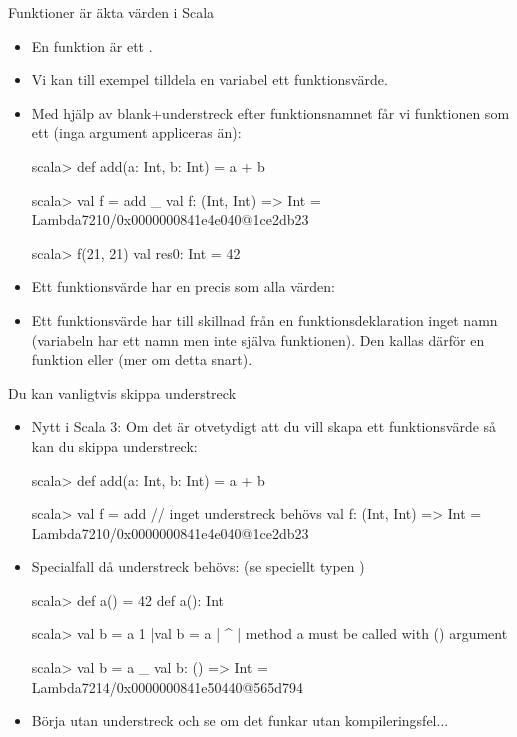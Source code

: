 
\begin{Slide}{Funktioner är äkta värden i Scala}\SlideFontSmall
	\begin{itemize}
		\item En funktion är ett .
		\item Vi kan till exempel tilldela en variabel ett funktionsvärde.
		      \pause
		\item Med hjälp av blank+understreck efter funktionsnamnet får vi funktionen som ett  (inga argument appliceras än):
		      \begin{REPLnonum}
			      scala> def add(a: Int, b: Int) = a + b

			      scala> val f = add _
			      val f: (Int, Int) => Int = Lambda7210/0x0000000841e4e040@1ce2db23

			      scala> f(21, 21)
			      val res0: Int = 42
		      \end{REPLnonum}
		\item Ett funktionsvärde har en  precis som alla värden: \\
		      \pause
		\item Ett funktionsvärde har till skillnad från en funktionsdeklaration inget namn (variabeln  har ett namn men inte själva funktionen). Den kallas därför en  funktion eller  (mer om detta snart).
	\end{itemize}
\end{Slide}

\begin{Slide}{Du kan vanligtvis skippa understreck}\SlideFontSmall
	\begin{itemize}\SlideFontSmall

		\item Nytt i Scala 3: Om det är otvetydigt att du vill skapa ett funktionsvärde så kan du skippa understreck:
		      \begin{REPLnonum}
			      scala> def add(a: Int, b: Int) = a + b

			      scala> val f = add     // inget understreck behövs
			      val f: (Int, Int) => Int = Lambda7210/0x0000000841e4e040@1ce2db23
		      \end{REPLnonum}

		\item Specialfall då understreck behövs: (se speciellt typen )
		      \begin{REPLsmall}
			      scala> def a() = 42
			      def a(): Int

			      scala> val b = a
			      1 |val b = a
			      |        ^
			      |        method a must be called with () argument

			      scala> val b = a _
			      val b: () => Int = Lambda7214/0x0000000841e50440@565d794
		      \end{REPLsmall}
		\item Börja utan understreck och se om det funkar utan kompileringsfel...
	\end{itemize}
\end{Slide}

